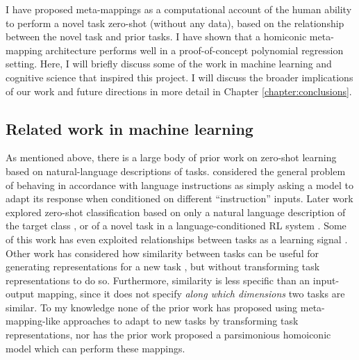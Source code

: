 I have proposed meta-mappings as a computational account of the human ability to perform a novel task zero-shot (without any data), based on the relationship between the novel task and prior tasks. I have shown that a homiconic meta-mapping architecture performs well in a proof-of-concept polynomial regression setting. Here, I will briefly discuss some of the work in machine learning and cognitive science that inspired this project. I will discuss the broader implications of our work and future directions in more detail in Chapter \ref{chapter:conclusions}. 

\subsection{Related work in machine learning}
As mentioned above, there is a large body of prior work on zero-shot learning based on natural-language descriptions of tasks. \citet{Larochelle2008} considered the general problem of behaving in accordance with language instructions as simply asking a model to adapt its response when conditioned on different ``instruction'' inputs. Later work explored zero-shot classification based on only a natural language description of the target class \citep{Socher2013,Romera-Paredes2015,Xian2018}, or of a novel task in a language-conditioned RL system \citep{Hermann2017, Hill2019a}. Some of this work has even exploited relationships between tasks as a learning signal \citep{Oh2017a}. Other work has considered how similarity between tasks can be useful for generating representations for a new task \citep{Pal2019}, but without transforming task representations to do so. Furthermore, similarity is less specific than an input-output mapping, since it does not specify \emph{along which dimensions} two tasks are similar. To my knowledge none of the prior work has proposed using meta-mapping-like approaches to adapt to new tasks by transforming task representations, nor has the prior work proposed a parsimonious homoiconic model which can perform these mappings.

